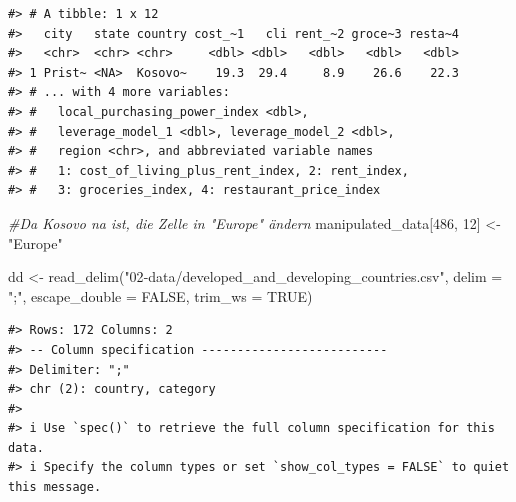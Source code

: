\documentclass[
  11pt,
  a4paper,
  twoside]{scrbook}
\newenvironment{Shaded}{\begin{snugshade}}{\end{snugshade}}
\newcommand{\AttributeTok}[1]{\textcolor[rgb]{0.77,0.63,0.00}{#1}}
\newcommand{\CommentTok}[1]{\textcolor[rgb]{0.56,0.35,0.01}{\textit{#1}}}
\newcommand{\ConstantTok}[1]{\textcolor[rgb]{0.00,0.00,0.00}{#1}}
\newcommand{\DecValTok}[1]{\textcolor[rgb]{0.00,0.00,0.81}{#1}}
\newcommand{\FunctionTok}[1]{\textcolor[rgb]{0.00,0.00,0.00}{#1}}
\newcommand{\NormalTok}[1]{#1}
\newcommand{\OtherTok}[1]{\textcolor[rgb]{0.56,0.35,0.01}{#1}}
\newcommand{\StringTok}[1]{\textcolor[rgb]{0.31,0.60,0.02}{#1}}
\begin{document}
\linespread{1}

\begin{verbatim}
#> # A tibble: 1 x 12
#>   city   state country cost_~1   cli rent_~2 groce~3 resta~4
#>   <chr>  <chr> <chr>     <dbl> <dbl>   <dbl>   <dbl>   <dbl>
#> 1 Prist~ <NA>  Kosovo~    19.3  29.4     8.9    26.6    22.3
#> # ... with 4 more variables:
#> #   local_purchasing_power_index <dbl>,
#> #   leverage_model_1 <dbl>, leverage_model_2 <dbl>,
#> #   region <chr>, and abbreviated variable names
#> #   1: cost_of_living_plus_rent_index, 2: rent_index,
#> #   3: groceries_index, 4: restaurant_price_index
\end{verbatim}

\linespread{1}

\begin{Shaded}
\begin{Highlighting}[]
\CommentTok{\#Da Kosovo na ist, die Zelle in "Europe" ändern}
\NormalTok{manipulated\_data[}\DecValTok{486}\NormalTok{, }\DecValTok{12}\NormalTok{] }\OtherTok{\textless{}{-}} \StringTok{"Europe"}

\NormalTok{dd }\OtherTok{\textless{}{-}} \FunctionTok{read\_delim}\NormalTok{(}\StringTok{"02{-}data/developed\_and\_developing\_countries.csv"}\NormalTok{,}
                 \AttributeTok{delim =} \StringTok{";"}\NormalTok{, }\AttributeTok{escape\_double =} \ConstantTok{FALSE}\NormalTok{,}
                 \AttributeTok{trim\_ws =} \ConstantTok{TRUE}\NormalTok{)}
\end{Highlighting}
\end{Shaded}

\linespread{1}

\begin{verbatim}
#> Rows: 172 Columns: 2
#> -- Column specification --------------------------
#> Delimiter: ";"
#> chr (2): country, category
#> 
#> i Use `spec()` to retrieve the full column specification for this data.
#> i Specify the column types or set `show_col_types = FALSE` to quiet this message.
\end{verbatim}

\linespread{1}
\end{document}
